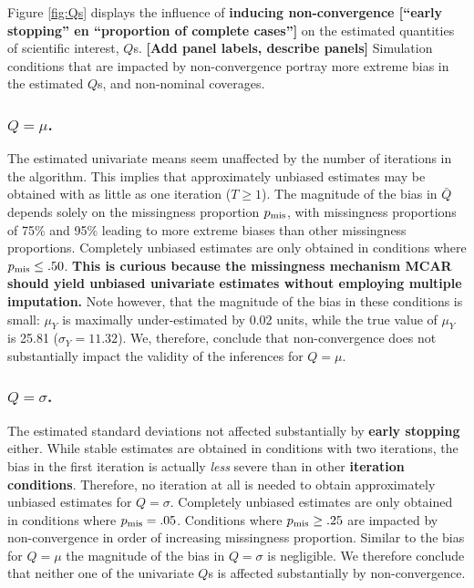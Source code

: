 \documentclass[Royal,times,sageh]{sagej}
\begin{document}
Figure \ref{fig:Qs} displays the influence of \textbf{inducing non-convergence {[}``early stopping'' en ``proportion of complete cases''{]}} on the estimated quantities of scientific interest, \(Q\)s. \textbf{{[}Add panel labels, describe panels{]}} Simulation conditions that are impacted by non-convergence portray more extreme bias in the estimated \(Q\)s, and non-nominal coverages.

\hypertarget{qmu.}{%
\subsubsection{\texorpdfstring{\(Q=\mu\).}{Q=\textbackslash mu.}}\label{qmu.}}

The estimated univariate means seem unaffected by the number of iterations in the algorithm. This implies that approximately unbiased estimates may be obtained with as little as one iteration (\(T \geq 1\)). The magnitude of the bias in \(\bar{Q}\) depends solely on the missingness proportion \(p_{\rm mis}\), with missingness proportions of 75\% and 95\% leading to more extreme biases than other missingness proportions. Completely unbiased estimates are only obtained in conditions where \(p_{\rm mis}\leq.50\). \textbf{This is curious because the missingness mechanism MCAR should yield unbiased univariate estimates without employing multiple imputation.} Note however, that the magnitude of the bias in these conditions is small: \(\mu_Y\) is maximally under-estimated by 0.02 units, while the true value of \(\mu_Y\) is 25.81 (\(\sigma_Y = 11.32\)). We, therefore, conclude that non-convergence does not substantially impact the validity of the inferences for \(Q=\mu\).

\hypertarget{qsigma.}{%
\subsubsection{\texorpdfstring{\(Q=\sigma\).}{Q=\textbackslash sigma.}}\label{qsigma.}}

The estimated standard deviations not affected substantially by \textbf{early stopping} either. While stable estimates are obtained in conditions with two iterations, the bias in the first iteration is actually \emph{less} severe than in other \textbf{iteration conditions}. Therefore, no iteration at all is needed to obtain approximately unbiased estimates for \(Q=\sigma\). Completely unbiased estimates are only obtained in conditions where \(p_{\rm mis}=.05\). Conditions where \(p_{\rm mis}\geq.25\) are impacted by non-convergence in order of increasing missingness proportion. Similar to the bias for \(Q=\mu\) the magnitude of the bias in \(Q=\sigma\) is negligible. We therefore conclude that neither one of the univariate \(Q\)s is affected substantially by non-convergence.
\end{document}

